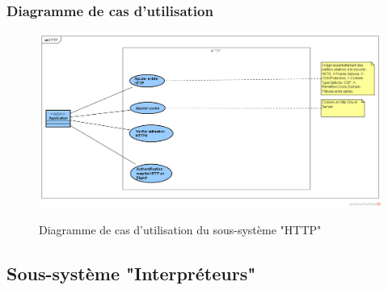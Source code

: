 \subsubsection{Diagramme de cas d'utilisation}
\begin{figure}[H]
	\centering
	\begin{minipage}{12cm}
		\centering
		{\includegraphics[height=0.35\textheight, width=1\textwidth]{fig/HTTP-use-case-diagram.png}}
	\end{minipage}
	\caption{Diagramme de cas d'utilisation du sous-système "HTTP"}
	\label{fig:7.17}
\end{figure}

\subsection{Sous-système "Interpréteurs"}
